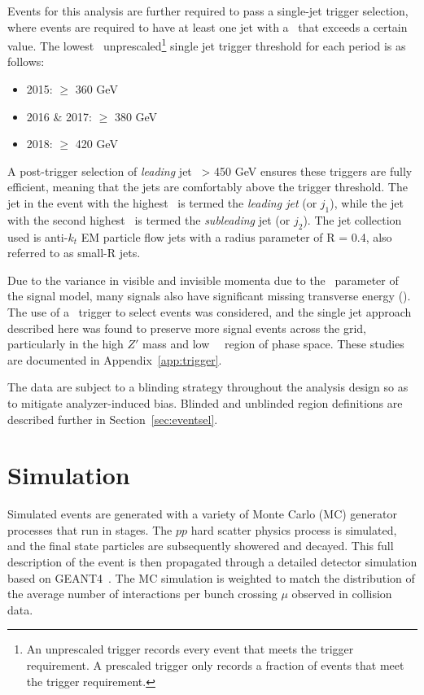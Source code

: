 Events for this analysis are further required to pass a single-jet trigger selection, where events are required to have at least one jet with a \pt~that exceeds a certain value. 
The lowest \pt~unprescaled\footnote{An unprescaled trigger records every event that meets the trigger requirement. A prescaled trigger only records a fraction of events that meet the trigger requirement.} single jet trigger threshold for each period is as follows: 

\begin{itemize}
\item 2015: \pt $\geq$ 360 GeV
\item 2016 \& 2017:  \pt $\geq$ 380 GeV
\item 2018:  \pt $\geq$ 420 GeV
\end{itemize}

A post-trigger selection of \textit{leading} jet \pt~> 450 GeV ensures these triggers are fully efficient, meaning that the jets are comfortably above the trigger threshold. The jet in the event with the highest \pt~is termed the \textit{leading jet} (or $j_1$), while the jet with the second highest \pt~is termed the \textit{subleading} jet (or $j_2$). The jet collection used is anti-$k_t$ EM particle flow jets with a radius parameter of R = 0.4, also referred to as small-R jets. \par

Due to the variance in visible and invisible momenta due to the \rinv~parameter of the signal model, many signals also have significant missing transverse energy (\met).
The use of a \met~trigger to select events was considered, and the single jet approach described here was found to preserve more signal events across the grid, particularly in the high $Z'$ mass and low ~\rinv~region of phase space. These studies are documented in Appendix~\ref{app:trigger}.\par

The data are subject to a blinding strategy throughout the analysis design so as to mitigate analyzer-induced bias. 
Blinded and unblinded region definitions are described further in Section~\ref{sec:eventsel}.

\section{Simulation}
\label{sec:simulation}

Simulated events are generated with a variety of Monte Carlo (MC) generator processes that run in stages. The $pp$ hard scatter physics process is simulated, and the final state particles are subsequently showered and decayed. This full description of the event is then propagated through a detailed detector simulation based on GEANT4~\cite{Agostinelli:2002hh}. The MC simulation is weighted to match the distribution of the average number of interactions per bunch crossing $\mu$ observed in collision data.\par

